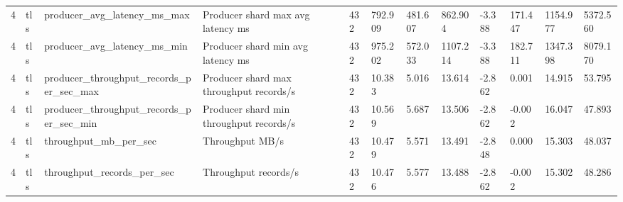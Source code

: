 \begin{longtable}{llllllllllll}
4 & tls & producer\_avg\_latency\_ms\_max & Producer shard max avg latency ms & 432 & 792.909 & 481.607 & 862.904 & -3.388 & 171.447 & 1154.977 & 5372.560 \\
4 & tls & producer\_avg\_latency\_ms\_min & Producer shard min avg latency ms & 432 & 975.202 & 572.033 & 1107.214 & -3.388 & 182.711 & 1347.398 & 8079.170 \\
4 & tls & producer\_throughput\_records\_per\_sec\_max & Producer shard max throughput records/s & 432 & 10.383 & 5.016 & 13.614 & -2.862 & 0.001 & 14.915 & 53.795 \\
4 & tls & producer\_throughput\_records\_per\_sec\_min & Producer shard min throughput records/s & 432 & 10.569 & 5.687 & 13.506 & -2.862 & -0.002 & 16.047 & 47.893 \\
4 & tls & throughput\_mb\_per\_sec & Throughput MB/s & 432 & 10.479 & 5.571 & 13.491 & -2.848 & 0.000 & 15.303 & 48.037 \\
4 & tls & throughput\_records\_per\_sec & Throughput records/s & 432 & 10.476 & 5.577 & 13.488 & -2.862 & -0.002 & 15.302 & 48.286 \\
\hline
\end{longtable}
